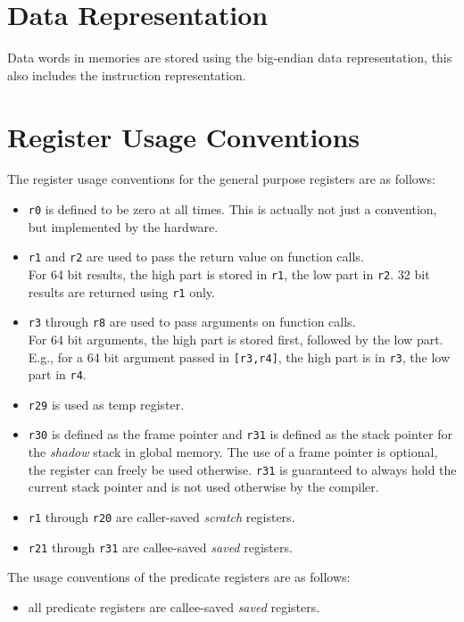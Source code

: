 \section{Data Representation}

Data words in memories are stored using the big-endian data representation, this
also includes the instruction representation.

\section{Register Usage Conventions}

The register usage conventions for the general purpose registers are as follows:
\begin{itemize}
  \item \texttt{r0} is defined to be zero at all times. This is actually not just a convention,
  but implemented by the hardware.
  \item \texttt{r1} and \texttt{r2} are used to pass the return value on
        function calls. \\
        For 64 bit results, the high part is stored in \texttt{r1},
        the low part in \texttt{r2}.
	32 bit results are returned using \texttt{r1} only.
  \item \texttt{r3} through \texttt{r8} are used to pass arguments on function
        calls. \\
        For 64 bit arguments, the high part is stored first,
        followed by the low part.\\ E.g., for a 64 bit argument passed in
        \texttt{[r3,r4]}, the high part is in \texttt{r3}, the low part
        in \texttt{r4}.
  \item \texttt{r29} is used as temp register.
  \item \texttt{r30} is defined as the frame pointer and
        \texttt{r31} is defined as the stack pointer for the \emph{shadow}
        stack in global memory.
        The use of a frame pointer is optional, the register can freely be
        used otherwise.
	\texttt{r31} is guaranteed to always hold the current stack pointer and
        is not used otherwise by the compiler.
  \item \texttt{r1} through \texttt{r20} are caller-saved \emph{scratch}
        registers.
  \item \texttt{r21} through \texttt{r31} are callee-saved \emph{saved}
        registers.
\end{itemize}

The usage conventions of the predicate registers are as follows:
\begin{itemize}
  \item all predicate registers are callee-saved \emph{saved} registers.
\end{itemize}


